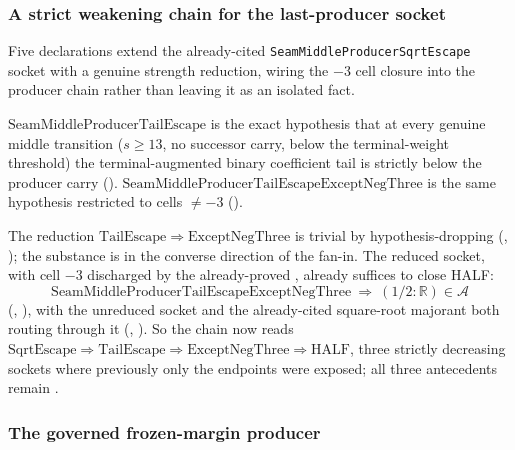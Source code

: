 \subsubsection{A strict weakening chain for the last-producer socket}

Five declarations extend the already-cited \texttt{SeamMiddleProducerSqrtEscape} socket with a
genuine strength reduction, wiring the $-3$ cell closure into the producer chain rather than
leaving it as an isolated fact.

\begin{defn}
$\mathrm{SeamMiddleProducerTailEscape}$ is the exact hypothesis that at every genuine middle
transition ($s\ge13$, no successor carry, below the terminal-weight threshold) the terminal-augmented
binary coefficient tail is strictly below the producer carry
().
$\mathrm{SeamMiddleProducerTailEscapeExceptNegThree}$ is the same hypothesis restricted to cells
$\ne-3$ ().
\end{defn}
The reduction $\mathrm{TailEscape}\Rightarrow\mathrm{ExceptNegThree}$ is trivial by hypothesis-dropping
(,
); the substance is in the converse direction of the fan-in. The reduced socket, with cell
$-3$ discharged by the already-proved
, already
suffices to close HALF:
\[
\mathrm{SeamMiddleProducerTailEscapeExceptNegThree}\ \Longrightarrow\ (1/2:\mathbb{R})\in\mathcal{A}
\]
(,
), with the unreduced socket and the already-cited square-root majorant both routing through
it (,
). So the chain now reads $\mathrm{SqrtEscape}\Rightarrow\mathrm{TailEscape}\Rightarrow
\mathrm{ExceptNegThree}\Rightarrow\mathrm{HALF}$, three strictly decreasing sockets where previously
only the endpoints were exposed; all three antecedents remain .

\subsubsection{The governed frozen-margin producer}

